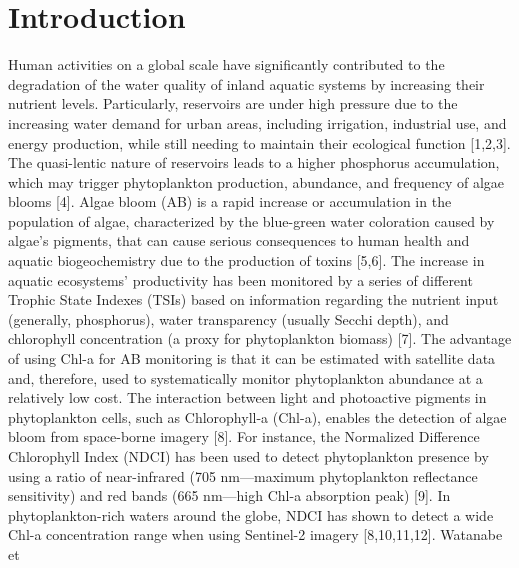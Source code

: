 \documentclass[
  12pt]{article}
\begin{document}
\newpage
{} %
\ifdefined\Shaded\renewenvironment{Shaded}{\begin{tcolorbox}[enhanced, breakable, borderline west={3pt}{0pt}{shadecolor}, frame hidden, interior hidden, boxrule=0pt, sharp corners]}{\end{tcolorbox}}\fi

\hypertarget{sec-intro}{%
\section{Introduction}\label{sec-intro}}

Human activities on a global scale have significantly contributed to the
degradation of the water quality of inland aquatic systems by increasing
their nutrient levels. Particularly, reservoirs are under high pressure
due to the increasing water demand for urban areas, including
irrigation, industrial use, and energy production, while still needing
to maintain their ecological function {[}1,2,3{]}. The quasi-lentic
nature of reservoirs leads to a higher phosphorus accumulation, which
may trigger phytoplankton production, abundance, and frequency of algae
blooms {[}4{]}. Algae bloom (AB) is a rapid increase or accumulation in
the population of algae, characterized by the blue-green water
coloration caused by algae's pigments, that can cause serious
consequences to human health and aquatic biogeochemistry due to the
production of toxins {[}5,6{]}. The increase in aquatic ecosystems'
productivity has been monitored by a series of different Trophic State
Indexes (TSIs) based on information regarding the nutrient input
(generally, phosphorus), water transparency (usually Secchi depth), and
chlorophyll concentration (a proxy for phytoplankton biomass) {[}7{]}.
The advantage of using Chl-a for AB monitoring is that it can be
estimated with satellite data and, therefore, used to systematically
monitor phytoplankton abundance at a relatively low cost. The
interaction between light and photoactive pigments in phytoplankton
cells, such as Chlorophyll-a (Chl-a), enables the detection of algae
bloom from space-borne imagery {[}8{]}. For instance, the Normalized
Difference Chlorophyll Index (NDCI) has been used to detect
phytoplankton presence by using a ratio of near-infrared (705
nm---maximum phytoplankton reflectance sensitivity) and red bands (665
nm---high Chl-a absorption peak) {[}9{]}. In phytoplankton-rich waters
around the globe, NDCI has shown to detect a wide Chl-a concentration
range when using Sentinel-2 imagery {[}8,10,11,12{]}. Watanabe et
\end{document}
